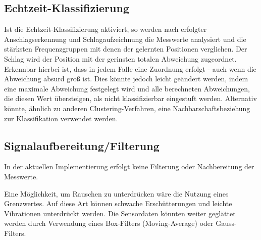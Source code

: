 \subsection*{Echtzeit-Klassifizierung}
Ist die Echtzeit-Klassifizierung aktiviert, so werden nach erfolgter Anschlagserkennung und Schlagaufzeichnung die Messwerte analysiert und die stärksten Frequenzgruppen mit denen der gelernten Positionen verglichen. Der Schlag wird der Position mit der gerinsten totalen Abweichung zugeordnet.
Erkennbar hierbei ist, dass in jedem Falle eine Zuordnung erfolgt - auch wenn die Abweichung absurd groß ist. Dies könnte jedoch leicht geändert werden, indem eine maximale Abweichung festgelegt wird und alle berechneten Abweichungen, die diesen Wert übersteigen, als nicht klassifizierbar eingestuft werden. Alternativ könnte, ähnlich zu anderen Clustering-Verfahren, eine Nachbarschaftsbeziehung zur Klassifikation verwendet werden.

\subsection*{Signalaufbereitung/Filterung}

In der aktuellen Implementierung erfolgt keine Filterung oder Nachbereitung der Messwerte. 


Eine Möglichkeit, um Rauschen zu unterdrücken wäre die Nutzung eines Grenzwertes. Auf diese Art können schwache Erschütterungen und leichte Vibrationen unterdrückt werden.
Die Sensordaten könnten weiter geglättet werden durch Verwendung eines Box-Filters (Moving-Average) oder Gauss-Filters.




